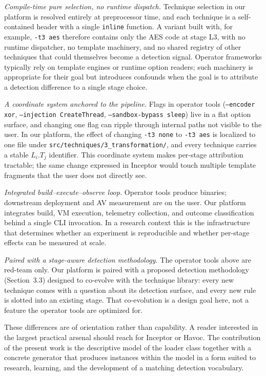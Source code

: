 \textit{Compile-time pure selection, no runtime dispatch.}
Technique selection in our platform is resolved entirely at preprocessor time, and each technique is a self-contained header with a single \texttt{inline} function.
A variant built with, for example, \texttt{-t3 aes} therefore contains only the AES code at stage L3, with no runtime dispatcher, no template machinery, and no shared registry of other techniques that could themselves become a detection signal.
Operator frameworks typically rely on template engines or runtime option readers; such machinery is appropriate for their goal but introduces confounds when the goal is to attribute a detection difference to a single stage choice.

\textit{A coordinate system anchored to the pipeline.}
Flags in operator tools (\texttt{--encoder xor}, \texttt{--injection CreateThread}, \texttt{--sandbox-bypass sleep}) live in a flat option surface, and changing one flag can ripple through internal paths not visible to the user.
In our platform, the effect of changing \texttt{-t3 none} to \texttt{-t3 aes} is localized to one file under \texttt{src/techniques/3\_transformation/}, and every technique carries a stable $L_i.T_j$ identifier.
This coordinate system makes per-stage attribution tractable; the same change expressed in Inceptor would touch multiple template fragments that the user does not directly see.

\textit{Integrated build--execute--observe loop.}
Operator tools produce binaries; downstream deployment and AV measurement are on the user.
Our platform integrates build, VM execution, telemetry collection, and outcome classification behind a single CLI invocation.
In a research context this is the infrastructure that determines whether an experiment is reproducible and whether per-stage effects can be measured at scale.

\textit{Paired with a stage-aware detection methodology.}
The operator tools above are red-team only.
Our platform is paired with a proposed detection methodology (Section~3.3) designed to co-evolve with the technique library: every new technique comes with a question about its detection surface, and every new rule is slotted into an existing stage.
That co-evolution is a design goal here, not a feature the operator tools are optimized for.

These differences are of orientation rather than capability.
A reader interested in the largest practical arsenal should reach for Inceptor or Havoc.
The contribution of the present work is the descriptive model of the loader class together with a concrete generator that produces instances within the model in a form suited to research, learning, and the development of a matching detection vocabulary.

